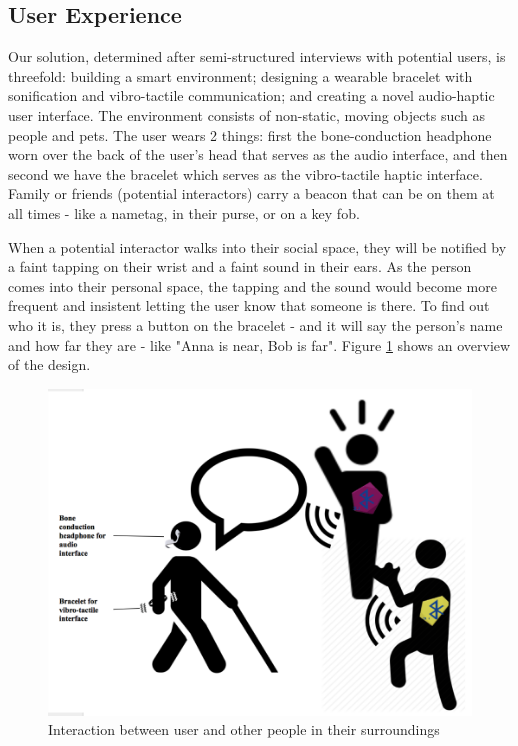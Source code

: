 \subsection{User Experience}
Our solution, determined after semi-structured interviews with potential users, is threefold: building a smart environment; designing a wearable bracelet with sonification and vibro-tactile communication; and creating a novel audio-haptic user interface. The environment consists of non-static, moving objects such as people and pets. The user wears 2 things: first the bone-conduction headphone worn over the back of the user's head that serves as the audio interface, and then second we have the bracelet which serves as the vibro-tactile haptic interface. Family or friends (potential interactors) carry a beacon that can be on them at all times - like a nametag, in their purse, or on a key fob. 

When a potential interactor walks into their social space, they will be notified by a faint tapping on their wrist and a faint sound in their ears.  As the person comes into their personal space, the tapping  and the sound would become more frequent and insistent letting the user know that someone is there. To find out who it is, they press a button on the bracelet - and it will say the person's name and how far they are - like "Anna is near, Bob is far". Figure \ref{fig:system} shows an overview of the design.

\begin{figure}[htbp]
\centering
\begin{center}
\includegraphics[width=\columnwidth]{figures/Proto2.png}
\end{center}
\caption{Interaction between user and other people in their surroundings}
\label{fig:system}
\end{figure}

